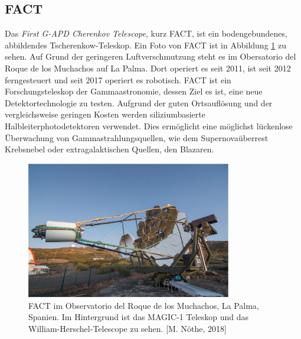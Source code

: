 \subsection{FACT}
Das \textit{First G-APD Cherenkov Telescope}, \cite{Anderhub_2013} kurz FACT, ist ein bodengebundenes, abbildendes Tscherenkow-Teleskop. Ein Foto von FACT ist in Abbildung \ref{fig:FACT} zu sehen. Auf Grund der geringeren Luftverschmutzung steht es im Obersatorio del Roque de los Muchachos auf La Palma. Dort operiert es seit 2011, ist seit 2012 ferngesteuert und seit 2017 operiert es robotisch. FACT ist ein Forschungsteleskop der Gammaastronomie, dessen Ziel es ist, eine neue Detektortechnologie zu testen. Aufgrund der guten Ortsauflösung und der vergleichsweise geringen Kosten werden siliziumbasierte Halbleiterphotodetektoren verwendet. Dies ermöglicht eine möglichst lückenlose Überwachung von Gammastrahlungsquellen, wie dem Supernovaüberrest Krebsnebel oder extragalaktischen Quellen, den Blazaren.
\begin{figure}
  \centering
  \includegraphics[width=0.8\textwidth]{graphics/Max.png}
  \caption{ FACT im Observatorio del Roque de los Muchachos, La Palma, Spanien. Im Hintergrund ist das MAGIC-1 Teleskop und das William-Herschel-Telescope zu sehen. [M. Nöthe, 2018]}
  \label{fig:FACT}
\end{figure}
